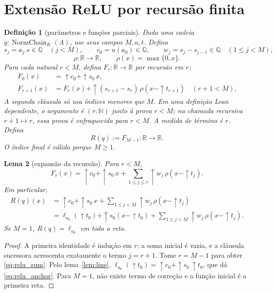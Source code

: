\documentclass[11pt,a4paper]{article}
\newtheorem{definicao}{Definição}[section]
\newtheorem{lema}[definicao]{Lema}
\newcommand{\N}{\mathbb N}
\newcommand{\Q}{\mathbb Q}
\newcommand{\R}{\mathbb R}
\begin{document}
\section{Extensão ReLU por recursão finita}
\label{sec:relu}

\begin{definicao}[parâmetros e funções parciais]\label{def:relu}
Dada uma cadeia $q:\operatorname{NormChain}_K(\Lambda)$, use seus
campos $M,a,t$. Defina
\[
 s_j=a_j.s\in\Q\quad(j<M),\qquad
 c_0=u(a_0)\in\Q,\qquad
 w_j=s_j-s_{j-1}\in\Q\quad(1\le j<M),
\]
\[
 \rho:\R\to\R,\qquad\rho(x)=\max\{0,x\}.
\]
Para cada natural $r<M$, defina $F_r:\R\to\R$ por recursão em $r$:
\begin{align*}
 F_0(x)&=\uparrow c_0+\uparrow s_0\,x,\\
 F_{r+1}(x)&=F_r(x)+\uparrow(s_{r+1}-s_r)\,
                       \rho(x-\uparrow t_{r+1})
                    \quad(r+1<M).
\end{align*}
A segunda cláusula só usa índices menores que $M$. Em uma definição
Lean dependente, o argumento é $(r:\N)$ junto à prova $r<M$;
na chamada recursiva $r+1\mapsto r$, essa prova é enfraquecida
para $r<M$. A medida de término é $r$.
Defina
\[
 R(q):=F_{M-1}:\R\to\R.
\]
O índice final é válido porque $M\ge1$.
\end{definicao}

\begin{lema}[expansão da recursão]\label{lem:sum}
Para $r<M$,
\[
 F_r(x)=\uparrow c_0+\uparrow s_0\,x+
        \sum_{1\le j\le r}\uparrow w_j\,\rho(x-\uparrow t_j).
\]
Em particular,
\begin{align}
 R(q)(x)&=\uparrow c_0+\uparrow s_0\,x+
        \sum_{1\le j<M}\uparrow w_j\,\rho(x-\uparrow t_j)
                                                       \label{eq:relu_sum}\\
 &=\ell_{a_0}(\uparrow t_0)+\uparrow s_0(x-\uparrow t_0)+
        \sum_{1\le j<M}\uparrow w_j\,\rho(x-\uparrow t_j).
                                                       \label{eq:relu_anchor}
\end{align}
Se $M=1$, $R(q)=\ell_{a_0}$ em toda a reta.
\end{lema}
\begin{proof}
A primeira identidade é indução em $r$: a soma inicial é vazia,
e a cláusula sucessora acrescenta exatamente o termo $j=r+1$.
Tome $r=M-1$ para obter \eqref{eq:relu_sum}. Pelo
lema~\ref{lem:line},
$\ell_{a_0}(\uparrow t_0)=\uparrow c_0+\uparrow s_0\,\uparrow t_0$,
que dá \eqref{eq:relu_anchor}. Para $M=1$, não existe termo de
correção e a função inicial é a primeira reta.
\end{proof}
\end{document}
